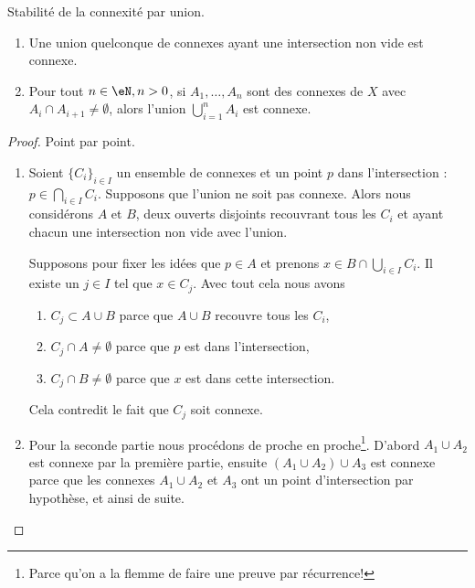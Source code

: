 \begin{proposition} \label{PropIWIDzzH}
    Stabilité de la connexité par union.
    \begin{enumerate}
        \item       \label{ITEMooLVSSooTGstBz}
    Une union quelconque de connexes ayant une intersection non vide est connexe.
\item
    Pour tout \( n \in \eN, n > 0 \), si \( A_1,\ldots, A_n\) sont des connexes de \( X\) avec \( A_i\cap A_{i+1}\neq \emptyset\), alors l'union \( \bigcup_{i=1}^nA_i\) est connexe.
    \end{enumerate}
\end{proposition}

\begin{proof}
    Point par point.
    \begin{enumerate}
        \item
    Soient \( \{ C_i \}_{i\in I}\) un ensemble de connexes et un point \( p\) dans l'intersection : \( p\in\bigcap_{i\in I}C_i\). Supposons que l'union ne soit pas connexe. Alors nous considérons \( A\) et \( B\), deux ouverts disjoints recouvrant tous les \( C_i\) et ayant chacun une intersection non vide avec l'union.

    Supposons pour fixer les idées que \( p\in A\) et prenons \( x\in B\cap\bigcup_{i\in I}C_i\). Il existe un \( j\in I\) tel que \( x\in C_j\). Avec tout cela nous avons
    \begin{enumerate}
        \item
            \( C_j\subset A\cup B\) parce que \(A \cup B\) recouvre tous les \( C_i \),
        \item
            \( C_j\cap A\neq \emptyset\) parce que \( p\) est dans l'intersection,
        \item
            \( C_j\cap B\neq\emptyset\) parce que \( x\) est dans cette intersection.
    \end{enumerate}
    Cela contredit le fait que \( C_j\) soit connexe.

\item

    Pour la seconde partie nous procédons de proche en proche\footnote{Parce qu'on a la flemme de faire une preuve par récurrence!}. D'abord \( A_1\cup A_2\) est connexe par la première partie, ensuite \( (A_1\cup A_2)\cup A_3\) est connexe parce que les connexes \( A_1\cup A_2\) et \( A_3\) ont un point d'intersection par hypothèse, et ainsi de suite.
    \end{enumerate}
\end{proof}


